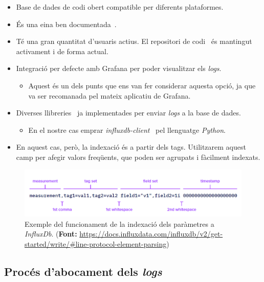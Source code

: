 \begin{itemize}
    \item Base de dades de codi obert compatible per diferents plataformes.
    \item És una eina ben documentada~\cite{influxdb:documentation}.
    \item Té una gran quantitat d’usuaris actius.
    El repositori de codi~\cite{influxdb:code} és mantingut activament i de forma actual.
    \item Integració per defecte amb Grafana per poder visualitzar els \textit{logs}.
    \begin{itemize}
        \item Aquest és un dels punts que ens van fer considerar aquesta opció, ja que va ser recomanada pel mateix aplicatiu de Grafana.
    \end{itemize}
    \item Diverses llibreries~\cite{influxdb:libraries} ja implementades per enviar \textit{\gls{log}s} a la base de dades.
    \begin{itemize}
        \item En el nostre cas emprar \textit{influxdb-client}~\cite{influxdb:python} pel llenguatge \textit{Python}.
    \end{itemize}
    \item En aquest cas, però, la indexació és a partir dels tags.
    Utilitzarem aquest camp per afegir valors freqüents, que poden ser agrupats i fàcilment indexats.
\end{itemize}

\begin{figure}[htbp]
    \centerline{\includegraphics[width=1\textwidth]{figures/influxdb-indexing}}
    \captionsetup{justification=centering}
    \caption{Exemple del funcionament de la indexació dels paràmetres a \textit{InfluxDb}. (\textbf{Font:} \url{https://docs.influxdata.com/influxdb/v2/get-started/write/\#line-protocol-element-parsing})}\label{fig:influxdb-indexing}
\end{figure}

\clearpage

\subsection{Procés d'abocament dels \textit{\gls{log}s}}\label{subsec:log-push}

